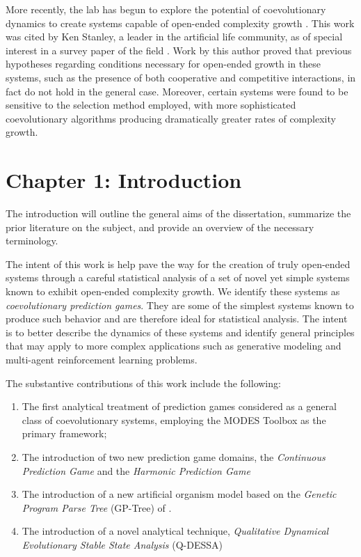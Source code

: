 \documentclass{article}
\begin{document}
More recently, the lab has begun to explore the potential of coevolutionary dynamics to create
systems capable of open-ended complexity growth \citep{harrington2019escalation,moran2019evolving}. 
This work was cited by Ken Stanley, a leader in the artificial life community, as of special 
interest in a survey paper of the field \citep{stanley2019}. Work by this author \citep{willkens2022} proved that 
previous hypotheses regarding conditions necessary for open-ended growth in these systems,
such as the presence of both cooperative and competitive interactions, in fact do not hold
in the general case. Moreover, certain systems were found to be sensitive to the 
selection method employed, with more sophisticated coevolutionary algorithms producing dramatically
greater rates of complexity growth.

\section*{Chapter 1: Introduction}
The introduction will outline the general aims of the dissertation, summarize the prior 
literature on the subject, and provide an overview of the necessary terminology.

The intent of this work is help pave the way for the creation of truly open-ended systems 
through a careful statistical analysis of a set of novel yet simple systems known to exhibit 
open-ended complexity growth. We identify
these systems as \textit{coevolutionary prediction games}. They are some of the simplest systems
known to produce such behavior and are therefore ideal for statistical analysis. The intent is 
to better describe the dynamics of these systems and identify general principles that may apply
to more complex applications such as generative modeling and multi-agent reinforcement learning problems.

The substantive contributions of this work include the following:
\begin{enumerate}
    \item The first analytical treatment of prediction games considered as a general class of 
        coevolutionary systems, employing the MODES Toolbox as the primary framework;
    \item The introduction of two new prediction game domains, the \textit{Continuous Prediction Game}
        and the \textit{Harmonic Prediction Game}
    \item The introduction of a new artificial organism model based on the \textit{Genetic Program Parse Tree}
        (GP-Tree) of \citet{Koza92}.
    \item The introduction of a novel analytical technique, 
        \textit{Qualitative Dynamical Evolutionary Stable State Analysis} (Q-DESSA)
\end{enumerate}
\end{document}
